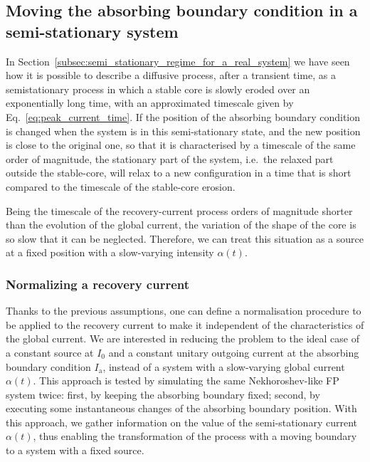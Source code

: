 
\subsection{Moving the absorbing boundary condition in a semi-stationary system}
\label{subsec:Moving_the_boundary_in_a_semi_stationary_system}


In Section~\ref{subsec:semi_stationary_regime_for_a_real_system} we have seen how it is possible to describe a diffusive process, after a transient time, as a semistationary process in which a stable core is slowly eroded over an exponentially long time, with an approximated timescale given by Eq.~\eqref{eq:peak_current_time}. If the position of the absorbing boundary condition is changed when the system is in this semi-stationary state, and the new position is close to the original one, so that it is characterised by a timescale of the same order of magnitude, the stationary part of the system, i.e.\ the relaxed part outside the stable-core, will relax to a new configuration in a time that is short compared to the timescale of the stable-core erosion.

Being the timescale of the recovery-current process orders of magnitude shorter than the evolution of the global current, the variation of the shape of the core is so slow that it can be neglected. Therefore, we can treat this situation as a source at a fixed position with a slow-varying intensity $\alpha(t)$. 


\subsubsection{Normalizing a recovery current}


Thanks to the previous assumptions, one can define a normalisation procedure to be applied to the recovery current to make it independent of the characteristics of the global current. We are interested in reducing the problem to the ideal case of a constant source at $I_0$ and a constant unitary outgoing current at the absorbing boundary condition $I_\mathrm{a}$, instead of a system with a slow-varying global current $\alpha(t)$. This approach is tested by simulating the same Nekhoroshev-like FP system twice: first, by keeping the absorbing boundary fixed; second, by executing some instantaneous changes of the absorbing boundary position. With this approach, we gather information on the value of the semi-stationary current $\alpha(t)$, thus enabling the transformation of the process with a moving boundary to a system with a fixed source.

